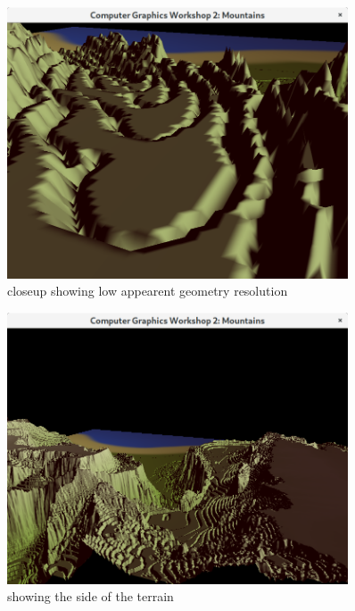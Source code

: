 \documentclass[a4paper, 11pt]{article} %
\begin{document}
\begin{figure}[ht]
\caption{closeup showing low appearent geometry resolution}
\centering
\includegraphics[width=0.9\textwidth]{shows_gradient}
\end{figure}



\begin{figure}[ht]
\caption{showing the side of the terrain}
\centering
\includegraphics[width=0.9\textwidth]{side_view}
\end{figure}
\end{document}
